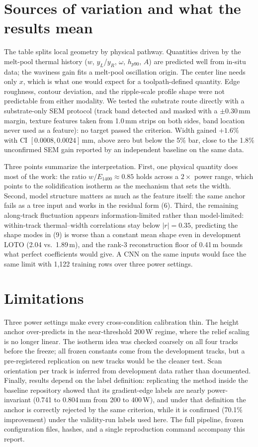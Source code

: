 \documentclass[10pt]{article}
\begin{document}
\section{Sources of variation and what the results mean}
The table splits local geometry by physical pathway. Quantities driven by
the melt-pool thermal history ($w$, $y_L$/$y_R$, $\omega$, $h_{p90}$, $A$)
are predicted well from in-situ data; the waviness gain fits a melt-pool
oscillation origin. The center line needs only $x$, which is what one would
expect for a toolpath-defined quantity. Edge roughness, contour deviation,
and the ripple-scale profile shape were not predictable from either
modality. We tested the substrate route directly with a substrate-only SEM
protocol (track band detected and masked with a $\pm 0.30$\,mm margin,
texture features taken from 1.0\,mm strips on both sides, band location
never used as a feature): no target passed the criterion. Width gained
$+1.6\%$ with CI $[0.0008, 0.0024]$\,mm, above zero but below the 5\% bar,
close to the 1.8\% unconfirmed SEM gain reported by an independent baseline
on the same data.

Three points summarize the interpretation. First, one physical quantity
does most of the work: the ratio $w/E_{1400} \approx 0.85$ holds across a
$2\times$ power range, which points to the solidification isotherm as the
mechanism that sets the width. Second, model structure matters as much as
the feature itself: the same anchor fails as a tree input and works in the
residual form (6). Third, the remaining along-track fluctuation appears
information-limited rather than model-limited: within-track thermal--width
correlations stay below $|r| = 0.35$, predicting the shape modes in (9) is
worse than a constant mean shape even in development LOTO (2.04 vs.\
1.89\,\textmu m), and the rank-3 reconstruction floor of 0.41\,\textmu m
bounds what perfect coefficients would give. A CNN on the same inputs would
face the same limit with 1{,}122 training rows over three power settings.

\section{Limitations}
Three power settings make every cross-condition calibration thin. The
height anchor over-predicts in the near-threshold 200\,W regime, where the
relief scaling is no longer linear. The isotherm idea was checked coarsely
on all four tracks before the freeze; all frozen constants come from the
development tracks, but a pre-registered replication on new tracks would
be the cleaner test. Scan orientation per track is inferred from
development data rather than documented. Finally, results depend on the
label definition: replicating the method inside the baseline repository
showed that its gradient-edge labels are nearly power-invariant (0.741 to
0.804\,mm from 200 to 400\,W), and under that definition the anchor is
correctly rejected by the same criterion, while it is confirmed
(70.1\% improvement) under the validity-run labels used here. The full
pipeline, frozen configuration files, hashes, and a single reproduction
command accompany this report.
\end{document}
